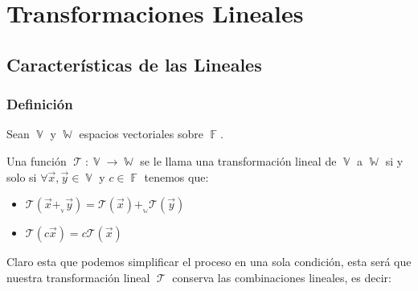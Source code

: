 \documentclass[12pt, fleqn]{report}                             %
\theoremstyle{break}                                            %
\DeclareMathOperator \GenericField {\mathbb{F}}                 %
\DeclareMathOperator \VectorSet    {\mathbb{V}}                 %
\DeclareMathOperator \SubVectorSet {\mathbb{W}}                 %
\DeclareMathOperator \LinTrans      {\mathcal{T}}               %
\newcommand{\Wrap}[1]           {\left( #1 \right)}             %
\newcommand{\FnLinTrans}[1]{\mathcal{T}\Wrap{#1}}               %
\begin{document}
          

            



\part{Transformaciones Lineales}
\clearpage



    \chapter{Características de las Lineales}


        \clearpage
        \section{Definición}


            Sean $\VectorSet$ y $\SubVectorSet$ espacios vectoriales sobre $\GenericField$.

            Una función $\LinTrans: \VectorSet \to \SubVectorSet$ se le llama una transformación lineal
            de $\VectorSet$ a $\SubVectorSet$ si y solo si 
            $\forall \vec x, \vec y \in \VectorSet$ y $c \in \GenericField$ tenemos que:
            \begin{itemize}
                \item 
                    $\FnLinTrans{\vec x +_{{}_{\VectorSet}} \vec y} 
                        = \FnLinTrans{\vec x} +_{{}_{\SubVectorSet}} \FnLinTrans{\vec y}$
                \item $\FnLinTrans{c\vec x} = c\FnLinTrans{\vec x}$
            \end{itemize}

            Claro esta que podemos simplificar el proceso en una sola condición, esta será que nuestra
            transformación lineal $\LinTrans$ conserva las combinaciones lineales, es decir:
\end{document}
